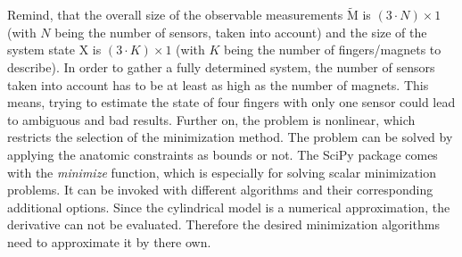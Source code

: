 Remind, that the overall size of the observable measurements $ \tilde{\mathrm{M}} $ is $ (3 \cdot N) \times 1 $ (with $ N $ being the number of sensors, taken into account) and the size of the system state X is $ (3 \cdot K) \times 1 $ (with $ K $ being the number of fingers/magnets to describe). In order to gather a fully determined system, the number of sensors taken into account has to be at least as high as the number of magnets. This means, trying to estimate the state of four fingers with only one sensor could lead to ambiguous and bad results. Further on, the problem is nonlinear, which restricts the selection of the minimization method. The problem can be solved by applying the anatomic constraints as bounds or not. The SciPy package comes with the \emph{minimize} function, which is especially for solving scalar minimization problems. It can be invoked with different algorithms and their corresponding additional options. Since the cylindrical model is a numerical approximation, the derivative can not be evaluated. Therefore the desired minimization algorithms need to approximate it by there own.

